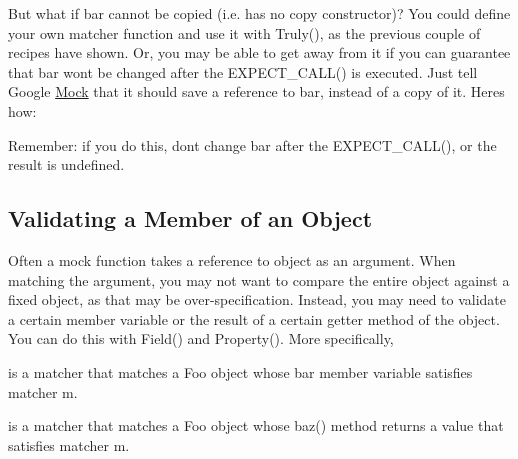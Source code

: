 But what if {\ttfamily bar} cannot be copied (i.\+e. has no copy constructor)? You could define your own matcher function and use it with {\ttfamily Truly()}, as the previous couple of recipes have shown. Or, you may be able to get away from it if you can guarantee that {\ttfamily bar} won\textquotesingle{}t be changed after the {\ttfamily E\+X\+P\+E\+C\+T\+\_\+\+C\+A\+L\+L()} is executed. Just tell Google \mbox{\hyperlink{class_mock}{Mock}} that it should save a reference to {\ttfamily bar}, instead of a copy of it. Here\textquotesingle{}s how\+:


\begin{DoxyCode}{0}
\DoxyCodeLine{}
\end{DoxyCode}


Remember\+: if you do this, don\textquotesingle{}t change {\ttfamily bar} after the {\ttfamily E\+X\+P\+E\+C\+T\+\_\+\+C\+A\+L\+L()}, or the result is undefined.

\subsection*{Validating a Member of an Object}

Often a mock function takes a reference to object as an argument. When matching the argument, you may not want to compare the entire object against a fixed object, as that may be over-\/specification. Instead, you may need to validate a certain member variable or the result of a certain getter method of the object. You can do this with {\ttfamily Field()} and {\ttfamily Property()}. More specifically,


\begin{DoxyCode}{0}
\end{DoxyCode}


is a matcher that matches a {\ttfamily Foo} object whose {\ttfamily bar} member variable satisfies matcher {\ttfamily m}.


\begin{DoxyCode}{0}
\end{DoxyCode}


is a matcher that matches a {\ttfamily Foo} object whose {\ttfamily baz()} method returns a value that satisfies matcher {\ttfamily m}.

